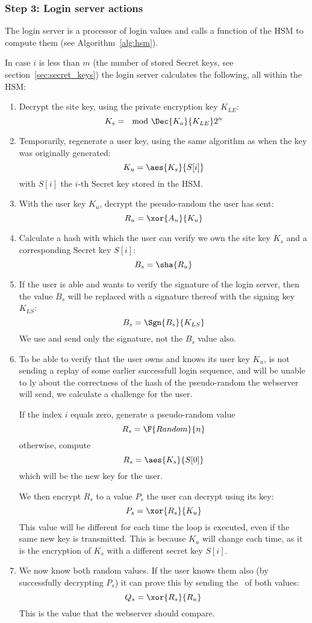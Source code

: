 \subsubsection{Step 3: Login server actions}
\label{sec:login_step3}
The login server is a processor of login values and calls a function of the HSM to compute them
(see Algorithm~\vref{alg:hsm}).
\par
In case $i$ is less than $m$
(the number of stored Secret keys, see section~\vref{sec:secret_keys})
the login server calculates the following, all within the HSM:
\begin{enumerate}
\item Decrypt the site key, using the private encryption key $K_{LE}$:
\[K_s=\mod{\Dec{K_a}{K_{LE}}}{2^n}\]
\item Temporarily, regenerate a user key, using the same algorithm as when the key was originally generated:
\[K_u=\aes{K_s}{S[i]}\]
with $S[i]$ the $i$-th Secret key stored in the HSM.
\item With the user key $K_u$, decrypt the pseudo-random the user has sent:
\[R_u=\xor{A_u}{K_u}\]
\item Calculate a hash with which the user can verify we own the site key $K_s$ and a corresponding Secret key $S[i]$:
\[B_s=\sha{R_u}\]
\item If the user is able and wants to verify the signature of the login server,
then the value $B_s$ will be replaced with a signature thereof with the signing key $K_{LS}$:
\[B_s=\Sgn{B_s}{K_{LS}}\]
We use and send only the signature, not the $B_s$ value also.
\item To be able to verify that the user owns and knows its user key $K_u$,
is not sending a replay of some earlier successfull login sequence,
and will be unable to ly about the correctness of the hash of the pseudo-random the webserver will send,
we calculate a challenge for the user.
\par
If the index $i$ equals zero, generate a pseudo-random value
\[R_s=\F{Random}{n}\]
otherwise, compute
\[R_s=\aes{K_s}{S[0]}\]
which will be the new key for the user.
\par
We then encrypt $R_s$ to a value $P_s$ the user can decrypt using its key:
\[P_s=\xor{R_s}{K_u}\]
This value will be different for each time the loop is executed,
even if the same new key is transmitted.
This is because $K_u$ will change each time,
as it is the encryption of $K_s$ with a different secret key $S[i]$.
\item We now know both random values.
If the user knows them also
(by successfully decrypting $P_s$)
it can prove this by sending the \XOR\ of both values:
\[Q_s=\xor{R_s}{R_u}\]
This is the value that the webserver should compare.
\end{enumerate}

